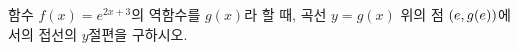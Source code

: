 함수 $f(x)=e^{2x+3}$의 역함수를 $g(x)$라 할 때, 곡선 $y=g(x)$ 위의 점 $(e{,}\mkern3mu\mathopen{}g(e))$에서의 접선의 $y$절편을 구하시오.
